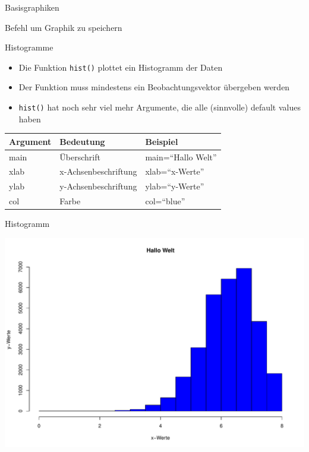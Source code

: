 \documentclass[ignorenonframetext,]{beamer}
\newenvironment{Shaded}{}{}
\newcommand{\KeywordTok}[1]{\textcolor[rgb]{0.00,0.44,0.13}{\textbf{{#1}}}}
\newcommand{\DataTypeTok}[1]{\textcolor[rgb]{0.56,0.13,0.00}{{#1}}}
\newcommand{\StringTok}[1]{\textcolor[rgb]{0.25,0.44,0.63}{{#1}}}
\newcommand{\NormalTok}[1]{{#1}}
\providecommand{\tightlist}{%
\setlength{\itemsep}{0pt}\setlength{\parskip}{0pt}}
\begin{document}
\begin{frame}[fragile]{Basisgraphiken}
\begin{block}{Befehl um Graphik zu speichern}
\end{block}

\begin{block}{Histogramme}

\begin{itemize}
\tightlist
\item
  Die Funktion \texttt{hist()} plottet ein Histogramm der Daten
\item
  Der Funktion muss mindestens ein Beobachtungsvektor übergeben werden
\item
  \texttt{hist()} hat noch sehr viel mehr Argumente, die alle
  (sinnvolle) default values haben
\end{itemize}

\begin{longtable}[]{@{}lll@{}}
\toprule
Argument & Bedeutung & Beispiel\tabularnewline
\midrule
\endhead
main & Überschrift & main=``Hallo Welt''\tabularnewline
xlab & x-Achsenbeschriftung & xlab=``x-Werte''\tabularnewline
ylab & y-Achsenbeschriftung & ylab=``y-Werte''\tabularnewline
col & Farbe & col=``blue''\tabularnewline
\bottomrule
\end{longtable}

\end{block}

\begin{block}{Histogramm}

\begin{Shaded}
\end{Shaded}

\includegraphics{R_intern_files/figure-beamer/unnamed-chunk-151-1.pdf}


\end{block}
\end{frame}
\end{document}
